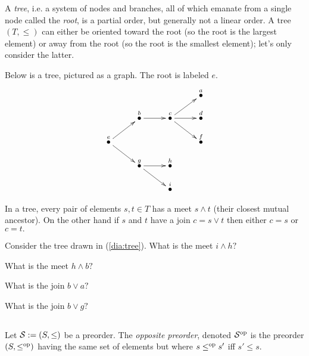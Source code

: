 \documentclass[CT4S-EN-RU]{subfiles}
\begin{document}
\begin{exampleENG}[Trees]\label{ex:tree}
A {\em tree}, i.e. a system of nodes and branches, all of which emanate from a single node called the {\em root}, is a partial order, but generally not a linear order. A tree $(T,\leq)$ can either be oriented toward the root (so the root is the largest element) or away from the root (so the root is the smallest element); let's only consider the latter. 

Below is a tree, pictured as a graph. The root is labeled $e.$
\begin{align}\label{dia:tree}
\xymatrix@=10pt{
&&&&&&\LMO{a}\\
&&\LMO{b}\ar[rr]&&\LMO{c}\ar[urr]\ar[rr]\ar[drr]&&\LMO{d}\\
\LMO{e}\ar[urr]\ar[drr]&&&&&&\LMO{f}\\
&&\LMO{g}\ar[rr]\ar[drr]&&\LMO{h}\\
&&&&\LMO{i}
}
\end{align}

In a tree, every pair of elements $s, t\in T$ has a meet $s\wedge t$ (their closest mutual ancestor). On the other hand if $s$ and $t$ have a join $c=s\vee t$ then either $c=s$ or $c=t.$ 
\end{exampleENG}

\begin{exampleRUS}[Trees]\label{ex:tree}
\end{exampleRUS}

\begin{exerciseENG}
Consider the tree drawn in (\ref{dia:tree}).
\sexc What is the meet $i\wedge h?$
\item What is the meet $h\wedge b?$
\item What is the join $b\vee a?$
\item What is the join $b\vee g?$
\endsexc
\end{exerciseENG}

\begin{exerciseRUS}
\end{exerciseRUS}


\subsection{}

\begin{definitionENG}\label{def:opposite order}
Let $\mathcal{S}:=(S,\leq)$ be a preorder. The {\em opposite preorder}, denoted $\mathcal{S}^\textnormal{op}$ is the preorder $(S,\leq^\textnormal{op})$ having the same set of elements but where $s\leq^\textnormal{op} s'$ iff $s'\leq s.$
\end{definitionENG}
\end{document}
